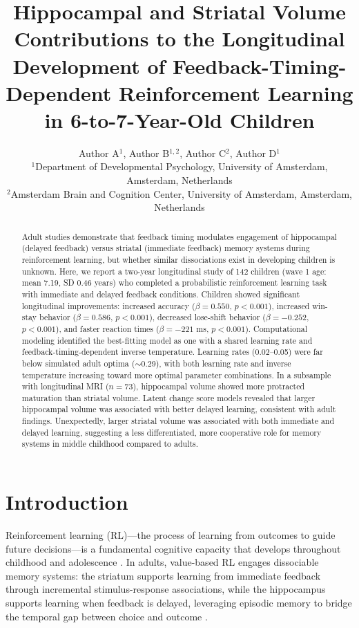 \documentclass[12pt]{article}
\title{Hippocampal and Striatal Volume Contributions to the Longitudinal Development of Feedback-Timing-Dependent Reinforcement Learning in 6-to-7-Year-Old Children}
\author{Author A$^{1}$, Author B$^{1,2}$, Author C$^{2}$, Author D$^{1}$ \\
\small $^{1}$Department of Developmental Psychology, University of Amsterdam, Amsterdam, Netherlands \\
\small $^{2}$Amsterdam Brain and Cognition Center, University of Amsterdam, Amsterdam, Netherlands}
\date{}
\begin{document}
\maketitle

\begin{abstract}
Adult studies demonstrate that feedback timing modulates engagement of hippocampal (delayed feedback) versus striatal (immediate feedback) memory systems during reinforcement learning, but whether similar dissociations exist in developing children is unknown. Here, we report a two-year longitudinal study of 142 children (wave 1 age: mean 7.19, SD 0.46 years) who completed a probabilistic reinforcement learning task with immediate and delayed feedback conditions. Children showed significant longitudinal improvements: increased accuracy ($\beta = 0.550$, $p < 0.001$), increased win-stay behavior ($\beta = 0.586$, $p < 0.001$), decreased lose-shift behavior ($\beta = -0.252$, $p < 0.001$), and faster reaction times ($\beta = -221$ ms, $p < 0.001$). Computational modeling identified the best-fitting model as one with a shared learning rate and feedback-timing-dependent inverse temperature. Learning rates (0.02--0.05) were far below simulated adult optima ($\sim$0.29), with both learning rate and inverse temperature increasing toward more optimal parameter combinations. In a subsample with longitudinal MRI ($n = 73$), hippocampal volume showed more protracted maturation than striatal volume. Latent change score models revealed that larger hippocampal volume was associated with better delayed learning, consistent with adult findings. Unexpectedly, larger striatal volume was associated with both immediate and delayed learning, suggesting a less differentiated, more cooperative role for memory systems in middle childhood compared to adults.
\end{abstract}

\section{Introduction}

Reinforcement learning (RL)---the process of learning from outcomes to guide future decisions---is a fundamental cognitive capacity that develops throughout childhood and adolescence \citep{sutton1998rl, nussenbaum2020development}. In adults, value-based RL engages dissociable memory systems: the striatum supports learning from immediate feedback through incremental stimulus-response associations, while the hippocampus supports learning when feedback is delayed, leveraging episodic memory to bridge the temporal gap between choice and outcome \citep{foerde2006hippocampus, shohamy2008striatum}.
\end{document}
